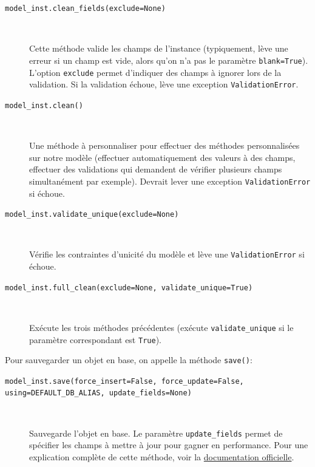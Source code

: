 \documentclass[a4paper, 10pt]{article}
\begin{document}
\begin{description}
    \item[\texttt{model_inst.clean_fields(exclude=None)}]~

            Cette méthode valide les champs de l'instance (typiquement, lève une erreur si un champ est vide, alors qu'on n'a pas le paramètre \texttt{blank=True}). L'option \texttt{exclude} permet d'indiquer des champs à ignorer lors de la validation. Si la validation échoue, lève une exception \texttt{ValidationError}.

    \item[\texttt{model_inst.clean()}]~

            Une méthode à personnaliser pour effectuer des méthodes personnalisées sur notre modèle (effectuer automatiquement des valeurs à des champs, effectuer des validations qui demandent de vérifier plusieurs champs simultanément par exemple). Devrait lever une exception \texttt{ValidationError} si échoue.

    \item[\texttt{model_inst.validate_unique(exclude=None)}]~

            Vérifie les contraintes d'unicité du modèle et lève une \texttt{ValidationError} si échoue.

    \item[\texttt{model_inst.full_clean(exclude=None, validate_unique=True)}]~

            Exécute les trois méthodes précédentes (exécute \texttt{validate_unique} si le paramètre correspondant est \texttt{True}).
\end{description}

Pour sauvegarder un objet en base, on appelle la méthode \texttt{save()}:


\begin{description}
    \item[\texttt{model_inst.save(force_insert=False, force_update=False, using=DEFAULT_DB_ALIAS, update_fields=None)}]~
    
    Sauvegarde l'objet en base. Le paramètre \texttt{update_fields} permet de spécifier les champs à mettre à jour pour gagner en performance.
    Pour une explication complète de cette méthode, voir la \href{https://docs.djangoproject.com/en/2.2/ref/models/instances/\#saving-objects}{documentation officielle}.
    
\end{description}
\end{document}
